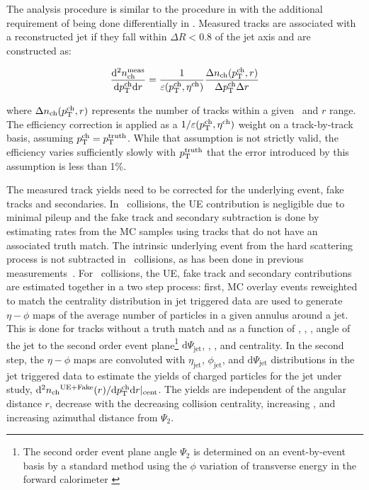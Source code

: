
The analysis procedure is similar to the procedure in \cite{PhysRevC.98.024908} with the additional requirement of being done differentially in \rvar. Measured tracks are associated with a reconstructed jet if they fall within $\Delta R < 0.8$ of the jet axis and are constructed as:

\begin{eqnarray}
\dfrac{\mathrm{d}^{2} \mbox{$n_{\mathrm{ch}}^{\mathrm{meas}}$} }{ \mathrm{d} \mbox{$p_{\mathrm{T}}^{\mathrm{ch}}$} \mathrm{d} r} = \frac{1}{\varepsilon(\mbox{$p_{\mathrm{T}}^{\mathrm{ch}}$},\mbox{$\eta^{\mathrm{ch}}$})} \frac{\Delta \mbox{$n_{\mathrm{ch}}$}( \mbox{$p_{\mathrm{T}}^{\mathrm{ch}}$}, r)}{ \Delta\mbox{$p_{\mathrm{T}}^{\mathrm{ch}}$} \Delta r}
\end{eqnarray}

where $\Delta \mbox{$n_{\mathrm{ch}}$} (\mbox{$p_{\mathrm{T}}^{\mathrm{ch}}$}, r)$ represents the number of tracks within a given \pttrk\ and $r$ range. The efficiency correction is applied as a $1/\varepsilon(\mbox{$p_{\mathrm{T}}^{\mathrm{ch}}$},\mbox{$\eta^{\mathrm{ch}}$})$ weight on a track-by-track basis, assuming $\mbox{$p_{\mathrm{T}}^{\mathrm{ch}}$} = \mbox{$p_{\mathrm{T}}^{\mathrm{truth}}$}$. While that assumption is not strictly valid, the efficiency varies sufficiently slowly with $\mbox{$p_{\mathrm{T}}^{\mathrm{truth}}$}$ that the error
introduced by this assumption is less than 1\%.

The measured track yields need to be corrected for the underlying event, fake tracks and secondaries. In \pp\ collisions, the UE contribution is negligible due to minimal pileup and the fake track and secondary subtraction is done by estimating rates from the MC samples using tracks that do not have an associated truth match.
The intrinsic underlying event from the hard scattering process is not subtracted in \pp\ collisions, as has been done in previous
measurements~\cite{Aaboud:2017tke,Aaboud:2018hpb}.
For \pbpb\ collisions, the UE, fake track and secondary contributions are estimated together in a two step process: first, MC overlay events reweighted to match the centrality distribution in jet triggered data are used to generate $\eta-\phi$ maps of the average number of particles in a given annulus around a jet. This is done for tracks without a truth match and as a function of \ptjet, \etajet, \phijet, angle of the jet to the second order event plane\footnote{The second order event plane angle $\Psi_2$ is determined on an event-by-event basis by a standard method using the $\phi$ variation of transverse energy in the forward calorimeter \cite{ATLAS:2012at}} $ \mathrm{d}\Psi_{\mathrm{jet}}$, \rvar, \pt, and centrality. In the second step, the $\eta-\phi$ maps are convoluted with $\eta_{\mathrm{jet}}$, $\phi_{\mathrm{jet}}$, and $\mathrm{d}\Psi_{\mathrm{jet}}$ distributions in the jet triggered data to estimate the yields of charged particles for the jet under study, \mbox{$\mathrm{d}^2 \mbox{$n_{\mathrm{ch}}$}^{\mathrm{UE+Fake}}(r) / \mathrm{d} \mbox{$p_{\mathrm{T}}^{\mathrm{ch}}$} \mathrm{d} r|_{\mathrm{cent}}$}. The yields are independent of the angular distance $r$, decrease with the decreasing collision centrality, increasing \pttrk, and increasing azimuthal distance from $\Psi_2$. 

